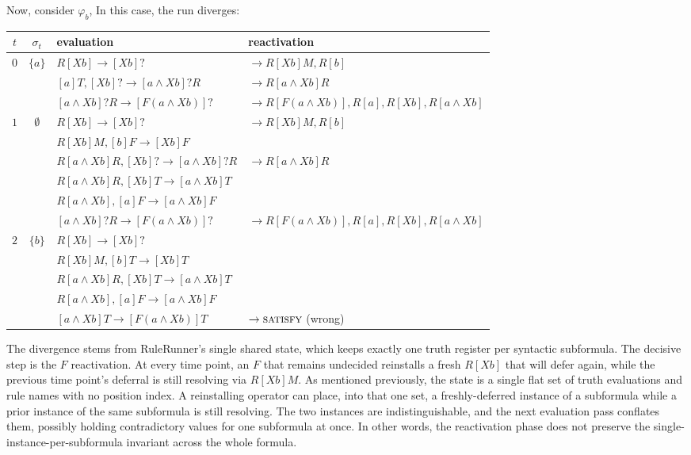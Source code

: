 Now, consider $\varphi_b$, In this case, the run diverges:
\begin{center}\small
\begin{tabular}{c c l l}
\toprule
$t$ & $\sigma_t$ & evaluation & reactivation\\
\midrule
\multirow{3}{*}{$0$} & \multirow{3}{*}{$\{a\}$} & $R[Xb] \rightarrow [Xb]?$ & $\rightarrow R[Xb]M,R[b]$ \\
&  & $[a]T,[Xb]? \rightarrow [a \land Xb]?R$ & $\rightarrow R[a \land Xb]R$  \\
&  & $[a \land Xb]?R \rightarrow [F(a \land Xb)]?$ & $\rightarrow R[F(a \land Xb)],R[a],R[Xb],R[a \land Xb]$ \\[1.5ex]

\multirow{6}{*}{$1$} & \multirow{6}{*}{$\emptyset$} & $R[Xb] \rightarrow [Xb]?$ & $\rightarrow R[Xb]M,R[b]$ \\
& & $R[Xb]M, [b]F \rightarrow [Xb]F$ & \\
&  & $R[a \land Xb]R,[Xb]? \rightarrow [a \land Xb]?R$ & $\rightarrow R[a \land Xb]R$  \\
&  & $R[a \land Xb]R,[Xb]T \rightarrow [a \land Xb]T$ &  \\
&  & $R[a \land Xb],[a]F \rightarrow [a \land Xb]F$ &  \\
&  & $[a \land Xb]?R \rightarrow [F(a \land Xb)]?$ & $\rightarrow R[F(a \land Xb)],R[a],R[Xb],R[a \land Xb]$ \\[1.5ex]

\multirow{5}{*}{$2$} & \multirow{5}{*}{$\{b\}$} & $R[Xb] \rightarrow [Xb]?$ & \\
& & $R[Xb]M, [b]T \rightarrow [Xb]T$ & \\
&  & $R[a \land Xb]R,[Xb]T \rightarrow [a \land Xb]T$ &  \\
&  & $R[a \land Xb],[a]F \rightarrow [a \land Xb]F$ &  \\
&  & $[a \land Xb]T \rightarrow [F(a \land Xb)]T$ & $\rightarrow \textsc{satisfy}$ (wrong) \\
\bottomrule
\end{tabular}
\end{center}

\noindent
The divergence stems from RuleRunner's single shared state, which keeps exactly one truth register per syntactic subformula.
The decisive step is the $F$ reactivation. At every time point, an $F$ that remains undecided reinstalls a fresh $R[Xb]$ that will defer again, while the previous time point's deferral is still resolving via $R[Xb]M$. As mentioned previously, the state is a single flat set of truth evaluations and rule names with no position index. A reinstalling operator can place, into that one set, a freshly-deferred instance of a subformula while a prior instance of the same subformula is still resolving. The two instances are indistinguishable, and the next evaluation pass conflates them, possibly holding contradictory values for one subformula at once. In other words, the reactivation phase does not preserve the single-instance-per-subformula invariant across the whole formula.

